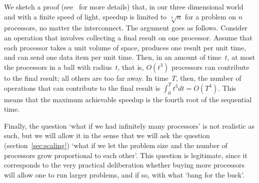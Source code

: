 We sketch a proof (see~\cite{Fisher:fastparallel} for more details)
that, in our three dimensional world and with a finite speed of light,
speedup is limited to $\sqrt[4]{n}$ for a problem on $n$ processors,
no matter the interconnect. The argument goes as follows. Consider an
operation that involves collecting a final result on one processor. Assume
that each processor takes a unit volume of space, produces one result
per unit time, and can send one data item per unit time. Then, in an
amount of time~$t$, at most the processors in a ball with radius~$t$,
that is, $O(t^3)$ processors can contribute to the
final result; all others are too far away. In time~$T$, then, the
number of operations 
that can contribute to the final result is $\int_0^T
t^3dt=O(T^4)$. This means that the maximum achievable speedup is the
fourth root of the sequential time.

Finally, the question `what if we had infinitely many processors' is
not realistic as such, but we will allow it in the sense that we will
ask the  question (section~\ref{sec:scaling})
`what if we let the problem size and the number of processors grow
proportional to each other'. This question is legitimate, since it
corresponds to the very practical deliberation whether buying more
processors will allow one to run larger problems, and if so, with what
`bang for the buck'.

